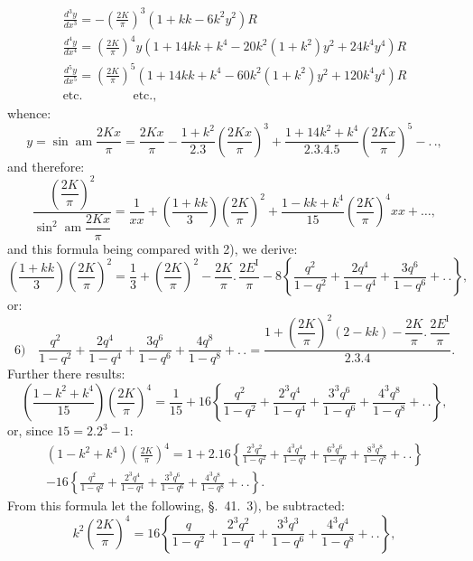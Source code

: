 \documentclass{article}
\begin{document}
\[
\begin{gathered}
\frac{d^{3}y}{dx^{3}}=-\left(\frac{2K}{\pi}\right)^{3}(1+kk-6k^{2}y^{2})R\\[1.5ex]
\frac{d^{4}y}{dx^{4}}=\left(\frac{2K}{\pi}\right)^{4}y\left(1+14kk+k^{4}-20k^{2}(1+k^{2})y^{2}+24k^{4}y^{4}\right)R\\[1.5ex]
\frac{d^{5}y}{dx^{5}}=\left(\frac{2K}{\pi}\right)^{5}\left(1+14kk+k^{4}-60k^{2}(1+k^{2})y^{2}+120k^{4}y^{4}\right)R\\[1.5ex]
\text{etc.}\qquad\qquad\text{etc.},
\end{gathered}
\]
whence:
\[
y=\sin\operatorname{am}\frac{2Kx}{\pi}=\frac{2Kx}{\pi}-\frac{1+k^{2}}{2.3}\left(\frac{2Kx}{\pi}\right)^{3}+\frac{1+14k^{2}+k^{4}}{2.3.4.5}\left(\frac{2Kx}{\pi}\right)^{5}-.\,.,
\]
and therefore:
\[
\frac{\left(\dfrac{2K}{\pi}\right)^{2}}{\sin^{2}\operatorname{am}\dfrac{2Kx}{\pi}}=\frac{1}{xx}+\left(\frac{1+kk}{3}\right)\left(\frac{2K}{\pi}\right)^{2}+\frac{1-kk+k^{4}}{15}\left(\frac{2K}{\pi}\right)^{4}xx+\ldots,
\]
and this formula being compared with 2), we derive:
\[
\left(\frac{1+kk}{3}\right)\left(\frac{2K}{\pi}\right)^{2}=\frac{1}{3}+\left(\frac{2K}{\pi}\right)^{2}-\frac{2K}{\pi}.\,\frac{2E^{\mathrm{I}}}{\pi}-8\left\{\frac{q^{2}}{1-q^{2}}+\frac{2q^{4}}{1-q^{4}}+\frac{3q^{6}}{1-q^{6}}+.\,.\right\},
\]
or:
\[
\text{6)}\quad\frac{q^{2}}{1-q^{2}}+\frac{2q^{4}}{1-q^{4}}+\frac{3q^{6}}{1-q^{6}}+\frac{4q^{8}}{1-q^{8}}+.\,.=\frac{1+\left(\dfrac{2K}{\pi}\right)^{2}(2-kk)-\dfrac{2K}{\pi}.\,\dfrac{2E^{\mathrm{I}}}{\pi}}{2.3.4}.
\]
Further there results:
\[
\left(\frac{1-k^{2}+k^{4}}{15}\right)\left(\frac{2K}{\pi}\right)^{4}=\frac{1}{15}+16\left\{\frac{q^{2}}{1-q^{2}}+\frac{2^{3}q^{4}}{1-q^{4}}+\frac{3^{3}q^{6}}{1-q^{6}}+\frac{4^{3}q^{8}}{1-q^{8}}+.\,.\right\},
\]
or, since $15=2.2^{3}-1$:
\[
\begin{gathered}
(1-k^{2}+k^{4})\left(\frac{2K}{\pi}\right)^{4}=1+2.16\left\{\frac{2^{3}q^{2}}{1-q^{2}}+\frac{4^{3}q^{4}}{1-q^{4}}+\frac{6^{3}q^{6}}{1-q^{6}}+\frac{8^{3}q^{8}}{1-q^{8}}+.\,.\right\}\\[1.5ex]
-16\left\{\frac{q^{2}}{1-q^{2}}+\frac{2^{3}q^{4}}{1-q^{4}}+\frac{3^{3}q^{6}}{1-q^{6}}+\frac{4^{3}q^{8}}{1-q^{8}}+.\,.\right\}.
\end{gathered}
\]
From this formula let the following, §.\ 41.\ 3), be subtracted:
\[
k^{2}\left(\frac{2K}{\pi}\right)^{4}=16\left\{\frac{q}{1-q^{2}}+\frac{2^{3}q^{2}}{1-q^{4}}+\frac{3^{3}q^{3}}{1-q^{6}}+\frac{4^{3}q^{4}}{1-q^{8}}+.\,.\right\},
\]
\end{document}
